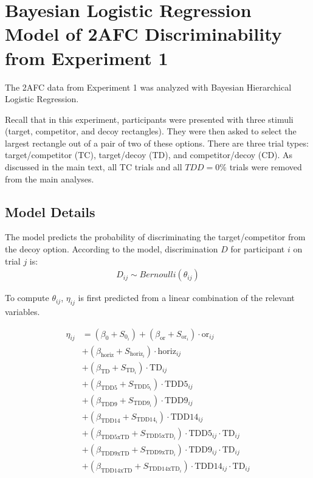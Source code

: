 \chapter{Bayesian Logistic Regression Model of 2AFC Discriminability from Experiment 1}
The 2AFC data from Experiment 1 was analyzed with Bayesian Hierarchical Logistic Regression. 

Recall that in this experiment, participants were presented with three stimuli (target, competitor, and decoy rectangles). They were then asked to select the largest rectangle out of a pair of two of these options. There are three trial types: target/competitor (TC), target/decoy (TD), and competitor/decoy (CD). As discussed in the main text, all TC trials and all $TDD = 0\%$ trials were removed from the main analyses.

\section{Model Details} 

The model predicts the probability of discriminating the target/competitor from the decoy option. According to the model, discrimination $D$ for participant $i$ on trial $j$ is:
\begin{align}
    D_{ij} \sim Bernoulli(\theta_{ij})
\end{align}

To compute $\theta_{ij}$, $\eta_{ij}$ is first predicted from a linear combination of the relevant variables.

\begin{align}
\eta_{ij} &= (\beta_{0} + S_{0_{i}}) + (\beta_{\mathrm{or}} + S_{\mathrm{or}_{i}}) \cdot \mathrm{or}_{ij} \\
          &+ (\beta_{\mathrm{horiz}} + S_{\mathrm{horiz}_{i}}) \cdot \mathrm{horiz}_{ij} \\
          &+ (\beta_{\mathrm{TD}} + S_{\mathrm{TD}_{i}}) \cdot \mathrm{TD}_{ij} \\
          &+ (\beta_{\mathrm{TDD5}} + S_{\mathrm{TDD5}_{i}}) \cdot \mathrm{TDD5}_{ij} \\
          &+ (\beta_{\mathrm{TDD9}} + S_{\mathrm{TDD9}_{i}}) \cdot \mathrm{TDD9}_{ij} \\
          &+ (\beta_{\mathrm{TDD14}} + S_{\mathrm{TDD14}_{i}}) \cdot \mathrm{TDD14}_{ij} \\
          &+ (\beta_{\mathrm{TDD5xTD}} + S_{\mathrm{TDD5xTD}_{i}}) \cdot \mathrm{TDD5}_{ij} \cdot \mathrm{TD}_{ij} \\
          &+ (\beta_{\mathrm{TDD9xTD}} + S_{\mathrm{TDD9xTD}_{i}}) \cdot \mathrm{TDD9}_{ij} \cdot \mathrm{TD}_{ij} \\
          &+ (\beta_{\mathrm{TDD14xTD}} + S_{\mathrm{TDD14xTD}_{i}}) \cdot \mathrm{TDD14}_{ij} \cdot \mathrm{TD}_{ij}
\end{align}

